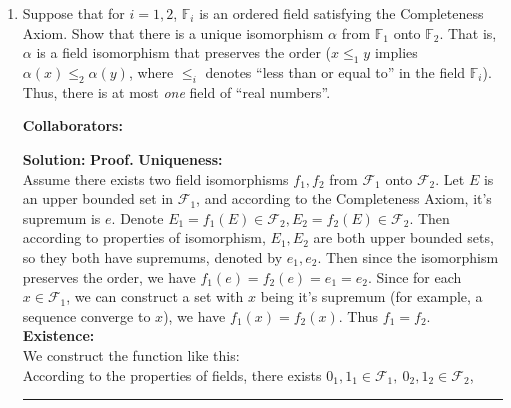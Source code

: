\documentclass{article}%
\newenvironment{proof}[1][Proof]{\textbf{#1.} }{\ \rule{0.5em}{0.5em}}
\begin{document}
\begin{enumerate}
\item Suppose that for $i = 1,2$, $\mathbb{F}_i$ is an ordered field satisfying the Completeness Axiom. Show that there is a unique isomorphism $\alpha$ from $\mathbb{F}_1$ onto $\mathbb{F}_2$. That is, $\alpha$ is a field isomorphism that preserves the order ($x \leq_1 y$ implies $\alpha(x) \leq_2 \alpha(y)$, where $\leq_i$ denotes ``less than or equal to'' in the field $\mathbb{F}_i$). Thus, there is at most \emph{one} field of ``real numbers''. 


\bigskip
\textbf{Collaborators:}\\
\smallskip

\textbf{Solution:} 
\begin{proof}
\textbf{Uniqueness:} \\
Assume there exists two field isomorphisms $f_1, f_2$ from $\mathcal{F}_1$ onto $\mathcal{F}_2$. Let $E$ is an upper bounded set in $\mathcal{F}_1$, and according to the Completeness Axiom, it's supremum is $e$. Denote $E_1 = f_1(E)\in \mathcal{F}_2, E_2 = f_2(E)\in\mathcal{F}_2$. Then according to properties of isomorphism, $E_1, E_2$ are both upper bounded sets, so they both have supremums, denoted by $e_1, e_2$. Then since the isomorphism preserves the order, we have $f_1(e) = f_2(e) = e_1 = e_2$. Since for each $x\in \mathcal{F}_1$, we can construct a set with $x$ being it's supremum (for example, a sequence converge to $x$), we have $f_1(x) = f_2(x)$. Thus $f_1 = f_2$. \\[5pt]
\textbf{Existence:} \\
We construct the function like this: \\
According to the properties of fields, there exists $0_1, 1_1\in \mathcal{F}_1,~ 0_2, 1_2\in \mathcal{F}_2$, 
\end{proof}
\bigskip


\end{enumerate}
\end{document}
